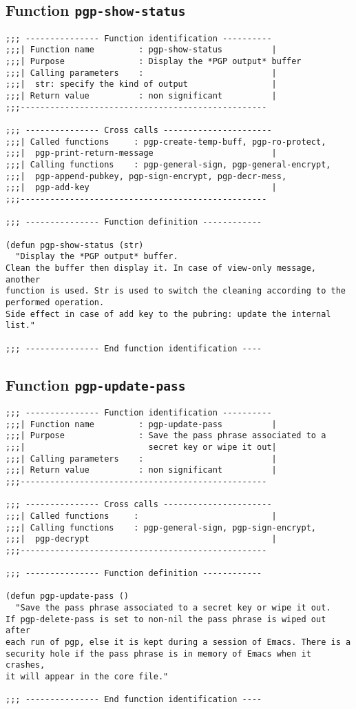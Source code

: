 \subsection{Function {\tt pgp-show-status}}
\leavevmode
\begin{verbatim}
;;; --------------- Function identification ----------
;;;| Function name         : pgp-show-status          |
;;;| Purpose               : Display the *PGP output* buffer
;;;| Calling parameters    :                          |
;;;|  str: specify the kind of output                 |
;;;| Return value          : non significant          |
;;;--------------------------------------------------

;;; --------------- Cross calls ----------------------
;;;| Called functions     : pgp-create-temp-buff, pgp-ro-protect,
;;;|  pgp-print-return-message                        |
;;;| Calling functions    : pgp-general-sign, pgp-general-encrypt,
;;;|  pgp-append-pubkey, pgp-sign-encrypt, pgp-decr-mess,
;;;|  pgp-add-key                                     |
;;;--------------------------------------------------

;;; --------------- Function definition ------------

(defun pgp-show-status (str)
  "Display the *PGP output* buffer.
Clean the buffer then display it. In case of view-only message, another
function is used. Str is used to switch the cleaning according to the 
performed operation.
Side effect in case of add key to the pubring: update the internal list."
  
;;; --------------- End function identification ----
\end{verbatim}
\subsection{Function {\tt pgp-update-pass}}
\leavevmode
\begin{verbatim}
;;; --------------- Function identification ----------
;;;| Function name         : pgp-update-pass          |
;;;| Purpose               : Save the pass phrase associated to a
;;;|                         secret key or wipe it out|
;;;| Calling parameters    :                          |
;;;| Return value          : non significant          |
;;;--------------------------------------------------

;;; --------------- Cross calls ----------------------
;;;| Called functions     :                           |
;;;| Calling functions    : pgp-general-sign, pgp-sign-encrypt,
;;;|  pgp-decrypt                                     |
;;;--------------------------------------------------

;;; --------------- Function definition ------------

(defun pgp-update-pass ()
  "Save the pass phrase associated to a secret key or wipe it out.
If pgp-delete-pass is set to non-nil the pass phrase is wiped out after
each run of pgp, else it is kept during a session of Emacs. There is a
security hole if the pass phrase is in memory of Emacs when it crashes,
it will appear in the core file."

;;; --------------- End function identification ----
\end{verbatim}
